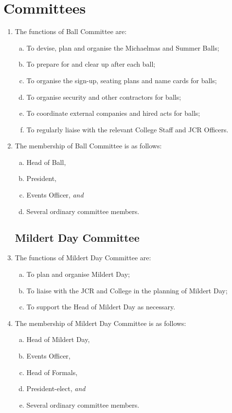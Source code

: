 \documentclass[12pt]{article}
\begin{document}
\section{Committees}
\begin{enumerate}
    \subsection{Ball Committee}
    \item The functions of Ball Committee are:
    \begin{enumerate}[(a)]
        \item To devise, plan and organise the Michaelmas and Summer Balls;
        \item To prepare for and clear up after each ball;
        \item To organise the sign-up, seating plans and name cards for balls;
        \item To organise security and other contractors for balls;
        \item To coordinate external companies and hired acts for balls;
        \item To regularly liaise with the relevant College Staff and JCR Officers.
    \end{enumerate}
    \item The membership of Ball Committee is as follows:
    \begin{enumerate}[(a)]
        \item Head of Ball,
        \item President,
        \item Events Officer, \emph{and}
        \item Several ordinary committee members.
    \end{enumerate}

    \subsection{Mildert Day Committee}
    \item The functions of Mildert Day Committee are:
    \begin{enumerate}[(a)]
        \item To plan and organise Mildert Day;
        \item To liaise with the JCR and College in the planning of Mildert Day;
        \item To support the Head of Mildert Day as necessary.
    \end{enumerate}
    \item The membership of Mildert Day Committee is as follows:
    \begin{enumerate}[(a)]
        \item Head of Mildert Day,
        \item Events Officer,
        \item Head of Formals,
        \item President-elect, \emph{and}
        \item Several ordinary committee members.
    \end{enumerate}


\end{enumerate}
\end{document}
